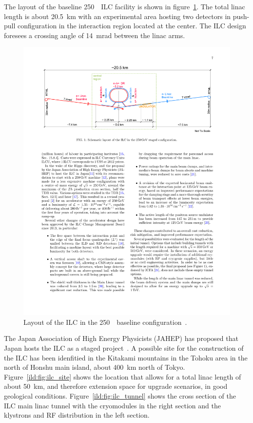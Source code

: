 The layout of the baseline 250~\GeV~ILC facility is shown in figure~\ref{ild:fig:ilc_footprint}. The total linac length is about 20.5~km with an experimental area hosting two detectors in push-pull configuration in the interaction region located at the center. The ILC design foresees a crossing angle of 14~mrad between the linac arms.
\begin{figure}[!ht]
\centering
\includegraphics[width=0.9\hsize]{ILC/figs/ILC_Footprint.pdf}

\caption{\label{ild:fig:ilc_footprint}Layout of the ILC in the 250~\GeV~baseline configuration~\cite{Bambade:2019fyw}.}
\end{figure}
The Japan Association of High Energy Physicists (JAHEP) has proposed that Japan hosts the ILC as a staged project~\cite{ild:bib:JAHEP}. A possible site for the construction of the ILC has been idenfitied in the Kitakami mountains in the Tohoku area in the north of Honshu main island, about 400~km north of Tokyo. Figure~\ref{ild:fig:ilc_site} shows the location that allows for a total linac length of about 50~km, and therefore extension space for upgrade scenarios, in good geological conditions. Figure~\ref{ild:fig:ilc_tunnel} shows the cross section of the ILC main linac tunnel with the cryomodules in the right section and the klystrons and RF distribution in the left section.

